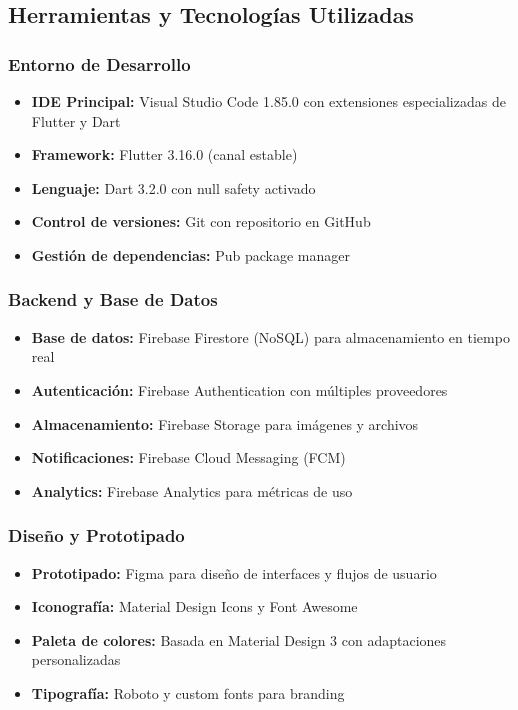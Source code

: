 \documentclass[12pt,a4paper]{report}
\begin{document}
\subsection{Herramientas y Tecnologías Utilizadas}

\subsubsection{Entorno de Desarrollo}
\begin{itemize}
	\item \textbf{IDE Principal:} Visual Studio Code 1.85.0 con extensiones especializadas de Flutter y Dart
	\item \textbf{Framework:} Flutter 3.16.0 (canal estable)
	\item \textbf{Lenguaje:} Dart 3.2.0 con null safety activado
	\item \textbf{Control de versiones:} Git con repositorio en GitHub
	\item \textbf{Gestión de dependencias:} Pub package manager
\end{itemize}

\subsubsection{Backend y Base de Datos}
\begin{itemize}
	\item \textbf{Base de datos:} Firebase Firestore (NoSQL) para almacenamiento en tiempo real
	\item \textbf{Autenticación:} Firebase Authentication con múltiples proveedores
	\item \textbf{Almacenamiento:} Firebase Storage para imágenes y archivos
	\item \textbf{Notificaciones:} Firebase Cloud Messaging (FCM)
	\item \textbf{Analytics:} Firebase Analytics para métricas de uso
\end{itemize}

\subsubsection{Diseño y Prototipado}
\begin{itemize}
	\item \textbf{Prototipado:} Figma para diseño de interfaces y flujos de usuario
	\item \textbf{Iconografía:} Material Design Icons y Font Awesome
	\item \textbf{Paleta de colores:} Basada en Material Design 3 con adaptaciones personalizadas
	\item \textbf{Tipografía:} Roboto y custom fonts para branding
\end{itemize}
\end{document}
